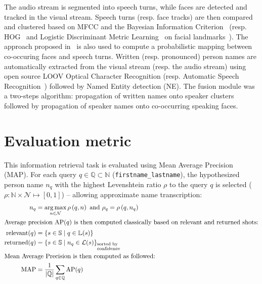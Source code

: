 \documentclass{acm_proc_article-me}
\newcommand\queries{\mathbb{Q}}
\newcommand\refLabels{\mathbb{L}}
\newcommand\refNames{\mathbb{N}}
\newcommand\shots{\mathbb{S}}
\newcommand\hypLabels{\mathcal{L}}
\newcommand\hypNames{\mathcal{N}}
\newcommand\ratio{\rho}
\DeclareMathOperator*{\argmax}{arg\,max}
\begin{document}
The audio stream is segmented into speech turns, while faces are detected and tracked in the visual stream.
Speech turns (resp. face tracks) are then compared and clustered based on MFCC and the Bayesian Information Criterion~\cite{CHEN--DARPA--1998} (resp. HOG~\cite{DALAL--CVPR--2005} and Logistic Discriminant Metric Learning~\cite{GUILLAUMIN--JCV--2012} on facial landmarks~\cite{URICAR--VISAPP--2012}). The approach proposed in~\cite{POIGNANT--MTAP--2015} is also used to compute a probabilistic mapping between co-occuring faces and speech turns. Written (resp. pronounced) person names are automatically extracted from the visual stream (resp. the audio stream) using open source LOOV Optical Character Recognition (resp. Automatic Speech Recognition~\cite{}) followed by Named Entity detection (NE). The fusion module was a two-steps algorithm: propagation of written names onto speaker clusters~\cite{POIGNANT--INTERSPEECH--2012} followed by propagation of speaker names onto co-occurring speaking faces.

\vspace{-0.1cm}
\section{Evaluation metric}
\label{sec:metric}

This information retrieval task is evaluated using Mean Average Precision (MAP).
For each query $q \in \queries \subset \refNames$ (\texttt{firstname\_lastname}), the hypothesized person name $n_q$ with the highest Levenshtein ratio $\rho$ to the query $q$ is selected ($\ratio : \refNames \times \hypNames \mapsto [0, 1]$) -- allowing approximate name transcription:
\begin{align}
\displaystyle n_q & = \argmax_{n \in \hypNames} \rho\left(q, n \right) \text{ and } \rho_q = \rho\left(q, n_q \right) \nonumber \\
\intertext{Average precision $\text{AP}(q)$ is then computed classically based on relevant and returned shots:}
\text{relevant}(q) & = \{ s \in \shots \;|\; q \in \refLabels(s) \} \nonumber \\
\text{returned}(q) & = {\{ s \in \shots \;|\; n_q \in \hypLabels(s) \}}_{\begin{subarray}{l}\text{sorted by}\\
    \text{confidence}\end{subarray}} \nonumber \\
\intertext{Mean Average Precision is then computed as followed:}
            \text{MAP} & = \frac{1}{|\queries|} \sum_{q \in \queries} \text{AP}(q) \nonumber
\end{align}
\end{document}
